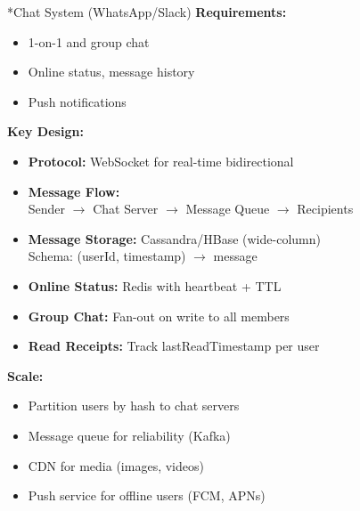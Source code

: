 \documentclass[8pt,landscape]{extarticle}
\makeatletter
\renewcommand{\subsection}{\@startsection{subsection}{2}{0pt}{3pt}{1pt}{\normalfont\normalsize\bfseries}}
\makeatother
\begin{document}
\begin{multicols*}{3}
\subsection*{Chat System (WhatsApp/Slack)}
\textbf{Requirements:}
\begin{itemize}
\item 1-on-1 and group chat
\item Online status, message history
\item Push notifications
\end{itemize}
\textbf{Key Design:}
\begin{itemize}
\item \textbf{Protocol:} WebSocket for real-time bidirectional
\item \textbf{Message Flow:}
  \\ Sender $\rightarrow$ Chat Server $\rightarrow$ Message Queue $\rightarrow$ Recipients
\item \textbf{Message Storage:} Cassandra/HBase (wide-column)
  \\ Schema: (userId, timestamp) $\rightarrow$ message
\item \textbf{Online Status:} Redis with heartbeat + TTL
\item \textbf{Group Chat:} Fan-out on write to all members
\item \textbf{Read Receipts:} Track lastReadTimestamp per user
\end{itemize}
\textbf{Scale:}
\begin{itemize}
\item Partition users by hash to chat servers
\item Message queue for reliability (Kafka)
\item CDN for media (images, videos)
\item Push service for offline users (FCM, APNs)
\end{itemize}


\end{multicols*}
\end{document}
